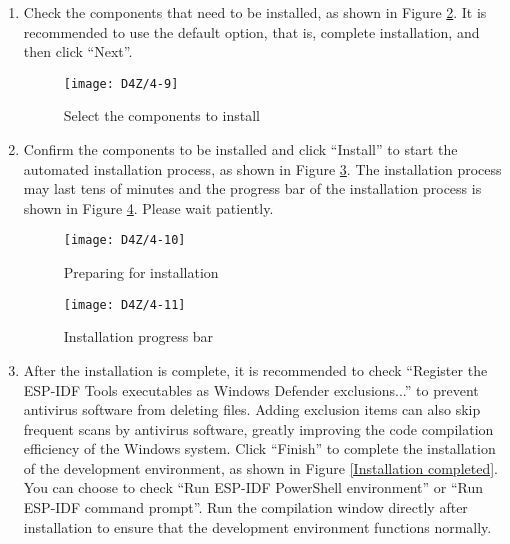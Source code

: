 \documentclass[a4paper,12pt]{book}
\begin{document}
\begin{enumerate}[label=(\arabic*)]
    \begin{figure}[h!]
        \centering
        \texttt{[image: D4Z/4-8]}
        \caption{Select the ESP-IDF installation directory}
        \label{Select the ESP-IDF installation directory}
    \end{figure}

    \item Check the components that need to be installed, as shown in Figure \ref{Select the components to install}. It is recommended to use the default option, that is, complete installation, and then click “Next”.

    \begin{figure}[h!]
        \centering
        \texttt{[image: D4Z/4-9]}
        \caption{Select the components to install}
        \label{Select the components to install}
    \end{figure}

    \item Confirm the components to be installed and click “Install” to start the automated installation process, as shown in Figure \ref{Preparing for installation}. The installation process may last tens of minutes and the progress bar of the installation process is shown in Figure \ref{Installation progress bar}. Please wait patiently.

    \begin{figure}[h!]
        \centering
        \texttt{[image: D4Z/4-10]}
        \caption{Preparing for installation}
        \label{Preparing for installation}
    \end{figure}

    \begin{figure}[h!]
        \centering
        \texttt{[image: D4Z/4-11]}
        \caption{Installation progress bar}
        \label{Installation progress bar}
    \end{figure}

    \item After the installation is complete, it is recommended to check “Register the ESP-IDF Tools executables as Windows Defender exclusions...” to prevent antivirus software from deleting files. Adding exclusion items can also skip frequent scans by antivirus software, greatly improving the code compilation efficiency of the Windows system. Click “Finish” to complete the installation of the development environment, as shown in Figure \ref{Installation completed}. You can choose to check “Run ESP-IDF PowerShell environment” or “Run ESP-IDF command prompt”. Run the compilation window directly after installation to ensure that the development environment functions normally.


\end{enumerate}
\end{document}
